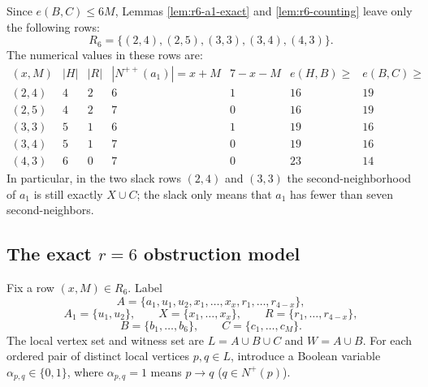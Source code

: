 \documentclass[a4paper,fleqn]{cas-sc}
\theoremstyle{definition}
\begin{document}
Since $e(B,C)\le 6M$, Lemmas \ref{lem:r6-a1-exact} and \ref{lem:r6-counting} leave only the following rows:
\begin{equation}\label{eq:R6rows}
R_6=\{(2,4),(2,5),(3,3),(3,4),(4,3)\}.
\end{equation}
The numerical values in these rows are:
\[
\begin{array}{c|c|c|c|c|c|c}
(x,M)&|H|&|R|&|N^{++}(a_1)|=x+M&7-x-M&e(H,B)\ge&e(B,C)\ge\\ \hline
(2,4)&4&2&6&1&16&19\\
(2,5)&4&2&7&0&16&19\\
(3,3)&5&1&6&1&19&16\\
(3,4)&5&1&7&0&19&16\\
(4,3)&6&0&7&0&23&14
\end{array}
\]
In particular, in the two slack rows $(2,4)$ and $(3,3)$ the second-neighborhood of $a_1$ is still exactly $X\cup C$; the slack only means that $a_1$ has fewer than seven second-neighbors.

\subsection*{The exact $r=6$ obstruction model}\label{subsec:r6-model}
Fix a row $(x,M)\in R_6$.  Label
\[
A=\{a_1,u_1,u_2,x_1,\ldots,x_x,r_1,\ldots,r_{4-x}\},
\]
\[
A_1=\{u_1,u_2\},\qquad X=\{x_1,\ldots,x_x\},\qquad R=\{r_1,\ldots,r_{4-x}\},
\]
\[
B=\{b_1,\ldots,b_6\},
\qquad C=\{c_1,\ldots,c_M\}.
\]
The local vertex set and witness set are $L=A\cup B\cup C$ and $W=A\cup B$.
For each ordered pair of distinct local vertices $p,q\in L$, introduce a Boolean variable $\alpha_{p,q}\in\{0,1\}$, where $\alpha_{p,q}=1$ means $p\to q$ ($q \in N^+(p)$).
\end{document}
